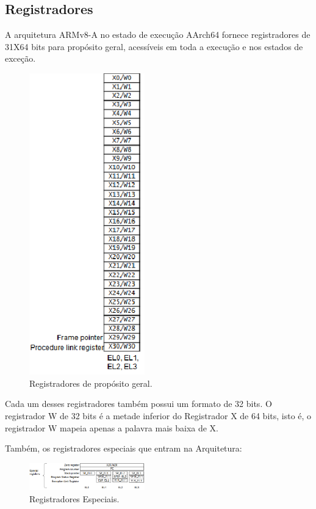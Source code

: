\documentclass[12pt,a4paper,utf8]{ppgsi}
\begin{document}
        \subsection{Registradores}
        A arquitetura ARMv8-A no estado de execução AArch64 fornece registradores de 31X64 bits para propósito geral, acessíveis em toda a execução e nos estados de exceção. 
        
        \begin{figure}[H]
		\centering
		\includegraphics[width=5cm]{regs.eps}
		\caption{Registradores de propósito geral.}
		\label{Fig:taxonomia}
	    \end{figure}
        
        Cada um desses registradores também possui um formato de 32 bits. O registrador W de 32 bits é a metade inferior do Registrador X de 64 bits, isto é, o registrador W mapeia apenas a palavra mais baixa de X.
        
        Também, os registradores especiais que entram na Arquitetura:

        \begin{figure}[H]
		\centering
		\includegraphics[width=5cm]{regsEspeciais.eps}
		\caption{Registradores Especiais.}
		\label{Fig:taxonomia}
	    \end{figure}
    
\end{document}
